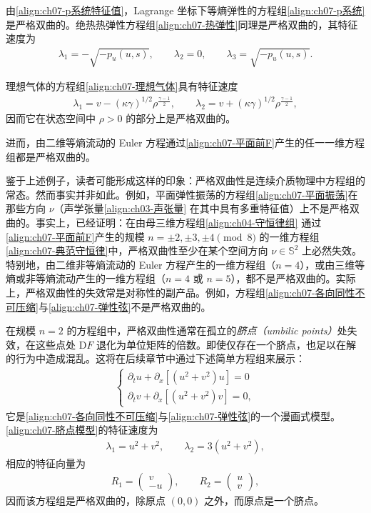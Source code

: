 \documentclass[../../main.tex]{subfiles}
\begin{document}
由\eqref{align:ch07-p系统特征值}，Lagrange 坐标下等熵弹性的方程组\eqref{align:ch07-p系统}是严格双曲的。绝热热弹性方程组\eqref{align:ch07-热弹性}同理是严格双曲的，其特征速度为
\begin{align}
\lambda_1=-\sqrt{-p_u(u,s)},\qquad \lambda_2=0,\qquad \lambda_3=\sqrt{-p_u(u,s)}.
\label{align:ch07-热弹性特征速度}
\end{align}

理想气体的方程组\eqref{align:ch07-理想气体}具有特征速度
\begin{align}
\lambda_1=v-(\kappa\gamma)^{1/2}\rho^{\frac{\gamma-1}{2}},\qquad
\lambda_2=v+(\kappa\gamma)^{1/2}\rho^{\frac{\gamma-1}{2}},
\label{align:ch07-理想气体特征速度}
\end{align}
因而它在状态空间中 $\rho>0$ 的部分上是严格双曲的。

进而，由二维等熵流动的 Euler 方程通过\eqref{align:ch07-平面前F}产生的任一一维方程组都是严格双曲的。

鉴于上述例子，读者可能形成这样的印象：严格双曲性是连续介质物理中方程组的常态。然而事实并非如此。例如，平面弹性振荡的方程组\eqref{align:ch07-平面振荡}在那些方向 $\nu$（声学张量\eqref{align:ch03-声张量}
在其中具有多重特征值）上不是严格双曲的。事实上，已经证明：在由母三维方程组\eqref{align:ch04-守恒律组}
通过\eqref{align:ch07-平面前F}产生的规模 $n=\pm2,\pm3,\pm4\pmod 8$ 的一维方程组\eqref{align:ch07-典范守恒律}中，严格双曲性至少在某个空间方向 $\nu\in\mathbb{S}^2$ 上必然失效。特别地，由二维非等熵流动的 Euler 方程产生的一维方程组（$n=4$），或由三维等熵或非等熵流动产生的一维方程组（$n=4$ 或 $n=5$），都不是严格双曲的。实际上，严格双曲性的失效常是对称性的副产品。例如，方程组\eqref{align:ch07-各向同性不可压缩}与\eqref{align:ch07-弹性弦}不是严格双曲的。

在规模 $n=2$ 的方程组中，严格双曲性通常在孤立的\emph{脐点（umbilic points）}处失效，在这些点处 $\mathrm{D}F$ 退化为单位矩阵的倍数。即使仅存在一个脐点，也足以在解的行为中造成混乱。这将在后续章节中通过下述简单方程组来展示：
\begin{align}
\begin{cases}
\partial_t u+\partial_x[(u^2+v^2)u]=0\\
\partial_t v+\partial_x[(u^2+v^2)v]=0,
\end{cases}
\label{align:ch07-脐点模型}
\end{align}
它是\eqref{align:ch07-各向同性不可压缩}与\eqref{align:ch07-弹性弦}的一个漫画式模型。\eqref{align:ch07-脐点模型}的特征速度为
\begin{align}
\lambda_1=u^2+v^2,\qquad \lambda_2=3(u^2+v^2),
\label{align:ch07-脐点模型特征速度}
\end{align}
相应的特征向量为
\begin{align}
R_1=\begin{pmatrix}v\\-u\end{pmatrix},\qquad R_2=\begin{pmatrix}u\\v\end{pmatrix},
\label{align:ch07-脐点模型特征向量}
\end{align}
因而该方程组是严格双曲的，除原点 $(0,0)$ 之外，而原点是一个脐点。
\end{document}
